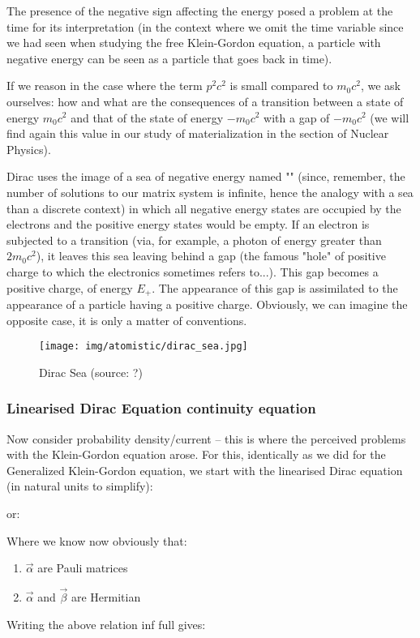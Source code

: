 	The presence of the negative sign affecting the energy posed a problem at the time for its interpretation (in the context where we omit the time variable since we had seen when studying the free Klein-Gordon equation, a particle with negative energy can be seen as a particle that goes back in time).

	If we reason in the case where the term $p^2c^2$ is small compared to $m_0c^2$, we ask ourselves: how and what are the consequences of a transition between a state of energy $m_0c^2$ and that of the state of energy $-m_0c^2$ with a gap of $-m_0c^2$ (we will find again this value in our study of materialization in the section of Nuclear Physics).

	Dirac uses the image of a sea of negative energy named "" (since, remember, the number of solutions to our matrix system is infinite, hence the analogy with a sea than a discrete context) in which all negative energy states are occupied by the electrons and the positive energy states would be empty. If an electron is subjected to a transition (via, for example, a photon of energy greater than $2m_0c^2$), it leaves this sea leaving behind a gap (the famous "hole" of positive charge to which the electronics sometimes refers to...). This gap becomes a positive charge, of energy $E_{+}$. The appearance of this gap is assimilated to the appearance of a particle having a positive charge. Obviously, we can imagine the opposite case, it is only a matter of conventions.
	\begin{figure}[H]
		\centering
		\texttt{[image: img/atomistic/dirac\_sea.jpg]}	
		\caption[Dirac Sea]{Dirac Sea (source: ?)}
	\end{figure}
	\subsubsection{Linearised Dirac Equation continuity equation}
	Now consider probability density/current – this is where the perceived problems with the Klein-Gordon equation arose. For this, identically as we did for the Generalized Klein-Gordon equation, we start with the linearised Dirac equation (in natural units to simplify):
	
	or:
	
	Where we know now obviously that:
	\begin{enumerate}
		\item $\vec{\alpha}$ are Pauli matrices
		
		\item $\vec{\alpha}$ and $\vec{\beta}$ are Hermitian
	\end{enumerate}
	Writing the above relation inf full gives:
	
